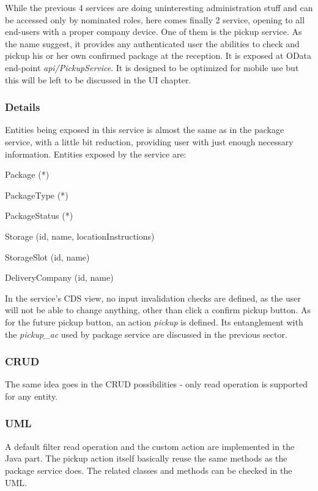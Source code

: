 While the previous 4 services are doing uninteresting administration stuff and can be accessed only by nominated roles, here comes finally 2 service, opening to all end-users with a proper company device. One of them is the pickup service. As the name suggest, it provides any authenticated user the abilities to check and pickup his or her own confirmed package at the reception. It is exposed at OData end-point \textit{api/PickupService}. It is designed to be optimized for mobile use but this will be left to be discussed in the UI chapter.

\subsubsection{Details}

Entities being exposed in this service is almost the same as in the package service, with a little bit reduction, providing user with just enough necessary information. Entities exposed by the service are:
\begin{compactenum}
	\item Package (*)
    \item PackageType (*)
    \item PackageStatus (*)
    \item Storage (id, name, locationInstructions)
    \item StorageSlot (id, name)
    \item DeliveryCompany (id, name)
\end{compactenum}

\bigskip
In the service's CDS view, no input invalidation checks are defined, as the user will not be able to change anything, other than click a confirm pickup button. As for the future pickup button, an action \textit{pickup} is defined. Its entanglement with the \textit{pickup\_ac} used by package service are discussed in the previous sector.

\subsubsection{CRUD}
The same idea goes in the CRUD possibilities - only read operation is supported for any entity.

\subsubsection{UML}

A default filter read operation and the custom action are implemented in the Java part. The pickup action itself basically reuse the same methods as the package service does. The related classes and methods can be checked in the UML. 

